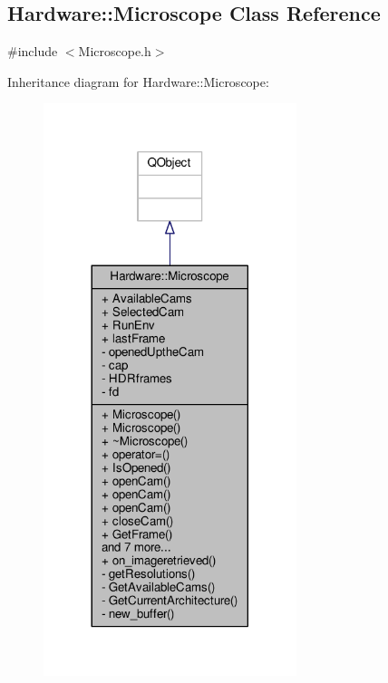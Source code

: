 \hypertarget{class_hardware_1_1_microscope}{}\subsection{Hardware\+:\+:Microscope Class Reference}
\label{class_hardware_1_1_microscope}


{\ttfamily \#include $<$Microscope.\+h$>$}



Inheritance diagram for Hardware\+:\+:Microscope\+:
\nopagebreak
\begin{figure}[H]
\begin{center}
\leavevmode
\includegraphics[width=209pt]{class_hardware_1_1_microscope__inherit__graph}
\end{center}
\end{figure}


